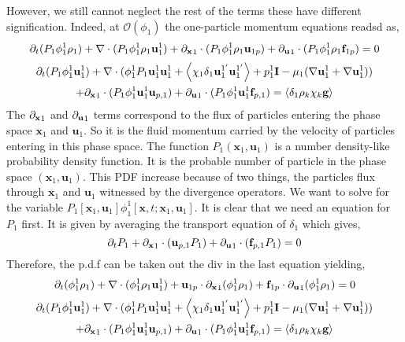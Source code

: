 However, we still cannot neglect the rest of the terms these have different signification. 
Indeed, at $\mathcal{O}(\phi_1)$ the one-particle momentum equations readsd as, 
\begin{equation}
    \partial_t (P_1\phi_1^1\rho_1)
    +  \mathbf{\nabla}\cdot (P_1\phi_1^1\rho_1\textbf{u}_1^1)
    +  {\partial_\textbf{x}}_1 \cdot
    (P_1\phi_1^1\rho_1 \textbf{u}_{1p})
    +  {\partial_\textbf{u}}_1 \cdot
    (P_1\phi_1^1\rho_1 \textbf{f}_{1p})
    = 0
\end{equation}
\begin{multline}
    \partial_t(P_1\phi_1^1 \textbf{u}_1^1)
    + \mathbf{\nabla}\cdot(
        \phi_1^1 P_1 \textbf{u}_1^1\textbf{u}_1^1
        +\left<\chi_1 \delta_1 \textbf{u}_1^{1'}\textbf{u}_1^{1'}\right>
        + p_1^1 \textbf{I}
        -\mu_1  (\mathbf{\nabla} \textbf{u}_1^1+\mathbf{\nabla} \textbf{u}_1^1)
    )\\
    + {\partial_\textbf{x}}_1 \cdot
        (P_1\phi_1^1 \textbf{u}_1^1 \textbf{u}_{p,1})
    + {\partial_\textbf{u}}_1 \cdot
        (P_1\phi_1^1 \textbf{u}_1^1 \textbf{f}_{p,1})
    = \left<\delta_1 \rho_k \chi_k \textbf{g} \right>
\end{multline}
The ${\partial_\textbf{x}}_1$ and ${\partial_\textbf{u}}_1$ terms correspond to the flux of particles entering the phase space $\textbf{x}_1$ and $\textbf{u}_1$. 
So it is the fluid momentum carried by the velocity of particles entering in this phase space. 
The function $P_1(\textbf{x}_1,\textbf{u}_1)$ is a number density-like probability density function. 
It is the probable number of particle in the phase space $(\textbf{x}_1,\textbf{u}_1)$. 
This PDF increase because of two things, the particles flux through $\textbf{x}_1$ and $\textbf{u}_1$ witnessed by the divergence operators. 
We want to solve for the variable $P_1[\textbf{x}_1,\textbf{u}_1]\phi_1^1[\textbf{x},t;\textbf{x}_1,\textbf{u}_1]$. 
It is clear that we need an equation for $P_1$ first. 
It is given by averaging the transport equation of $\delta_1$ which gives, 
\begin{equation*}
    \partial_t P_1
    + 
     {\partial_\textbf{x}}_1\cdot(\textbf{u}_{p,1}  P_1)
    +{\partial_\textbf{u}}_1\cdot(\textbf{f}_{p,1}  P_1)
    = 0 
\end{equation*}
Therefore, the p.d.f can be taken out the div in the last equation yielding, 
\begin{equation}
    \partial_t (\phi_1^1\rho_1)
    +    \mathbf{\nabla}\cdot (\phi_1^1\rho_1\textbf{u}_1^1)
    +   \textbf{u}_{1p} \cdot {\partial_\textbf{x}}_1  (\phi_1^1\rho_1 )
    +   \textbf{f}_{1p} \cdot {\partial_\textbf{u}}_1  (\phi_1^1\rho_1 )
    = 0
\end{equation}
\begin{multline}
    \partial_t(P_1\phi_1^1 \textbf{u}_1^1)
    + \mathbf{\nabla}\cdot(
        \phi_1^1 P_1 \textbf{u}_1^1\textbf{u}_1^1
        +\left<\chi_1 \delta_1 \textbf{u}_1^{1'}\textbf{u}_1^{1'}\right>
        + p_1^1 \textbf{I}
        -\mu_1  (\mathbf{\nabla} \textbf{u}_1^1+\mathbf{\nabla} \textbf{u}_1^1)
    )\\
    + {\partial_\textbf{x}}_1 \cdot
        (P_1\phi_1^1 \textbf{u}_1^1 \textbf{u}_{p,1})
    + {\partial_\textbf{u}}_1 \cdot
        (P_1\phi_1^1 \textbf{u}_1^1 \textbf{f}_{p,1})
    = \left<\delta_1 \rho_k \chi_k \textbf{g} \right>
\end{multline}
